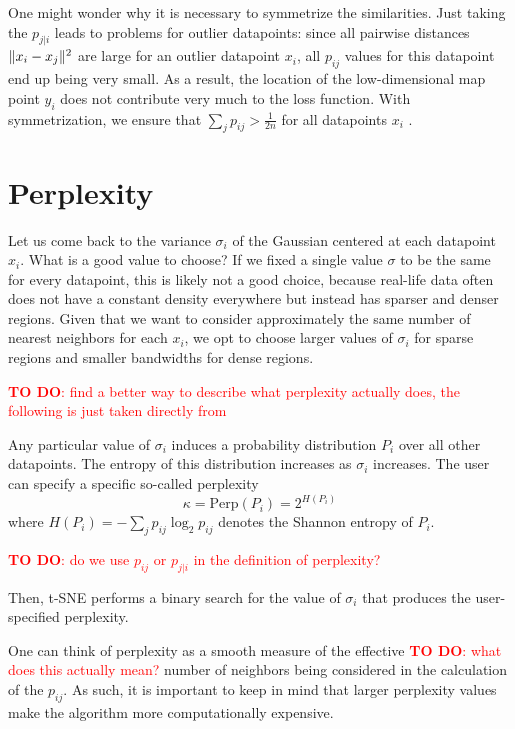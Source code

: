 One might wonder why it is necessary to symmetrize the similarities. Just taking the $p_{j|i}$ leads to problems for outlier datapoints: since all pairwise distances $\lVert x_i - x_j\rVert^2$ are large for an outlier datapoint $x_i$, all $p_{ij}$ values for this datapoint end up being very small. 
As a result, the location of the low-dimensional map point $y_i$ does not contribute very much to the loss function. With symmetrization, we ensure that $\sum_{j} p_{ij} > \frac{1}{2n}$ for all datapoints $x_i$ \cite{vdMaa08}. 

\section{Perplexity}
Let us come back to the variance $\sigma_i$ of the Gaussian centered at each datapoint $x_i$. What is a good value to choose? 
If we fixed a single value $\sigma$ to be the same for every datapoint, this is likely not a good choice, because real-life data often does not have a constant density everywhere but instead has sparser and denser regions. 
Given that we want to consider approximately the same number of nearest neighbors for each $x_i$, we opt to choose larger values of $\sigma_i$ for sparse regions and smaller bandwidths for dense regions. 

\textcolor{red}{\textbf{TO DO}: find a better way to describe what perplexity actually does, the following is just taken directly from \cite{vdMaa08}}

Any particular value of $\sigma_i$ induces a probability distribution $P_i$ over all other datapoints. 
The entropy of this distribution increases as $\sigma_i$ increases. 
The user can specify a specific so-called perplexity
\begin{equation}
    \kappa = \text{Perp}(P_i) = 2^{H(P_i)} 
\end{equation}
where $H(P_i) = -\sum_{j} p_{ij} \log_2 p_{ij}$ denotes the Shannon entropy of $P_i$. 

\textcolor{red}{\textbf{TO DO}: do we use $p_{ij}$ or $p_{j|i}$ in the definition of perplexity?}

Then, t-SNE performs a binary search for the value of $\sigma_i$ that produces the user-specified perplexity. 

One can think of perplexity as a smooth measure of the effective \textcolor{red}{\textbf{TO DO}: what does this actually mean?} number of neighbors being considered in the calculation of the $p_{ij}$. 
As such, it is important to keep in mind that larger perplexity values make the algorithm more computationally expensive. 

